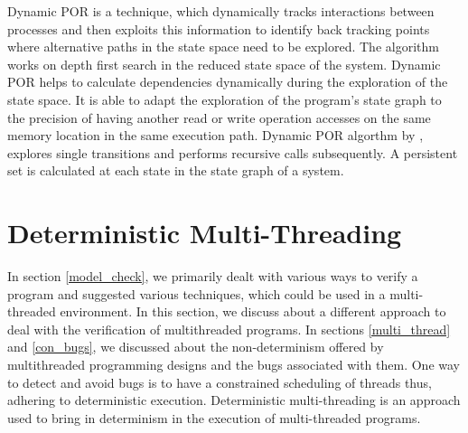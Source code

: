 Dynamic POR is a technique, which dynamically tracks interactions between processes and then exploits this information to identify back tracking points where alternative paths in the state space need to be explored\cite{dynamic_por}. 
The algorithm works on depth first search in the reduced state space of the system. 
Dynamic POR helps to calculate dependencies dynamically during the exploration of the state space. 
It is able to adapt the exploration of the program's state graph to the precision of having another read or write operation accesses on the same memory location in the same execution path. 
Dynamic POR algorthm by \citet{dynamic_por}, explores single transitions and performs recursive calls subsequently. 
A persistent set is calculated at each state in the state graph of a system.


\section{Deterministic Multi-Threading}

In section \ref{model_check}, we primarily dealt with various ways to verify a program and suggested various techniques, which could be used in a multi-threaded environment. 
In this section, we discuss about a different approach to deal with the verification of multithreaded programs. 
In sections \ref{multi_thread} and \ref{con_bugs}, we discussed about the non-determinism offered by multithreaded programming designs and the bugs associated with them. 
One way to detect and avoid bugs is to have a constrained scheduling of threads thus, adhering to deterministic execution. 
Deterministic multi-threading is an approach used to bring in determinism in the execution of multi-threaded programs. 

